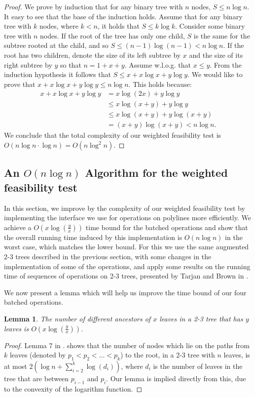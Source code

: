 \documentclass[11pt,a4paper]{article}
\newtheorem{lemma}{Lemma}
\theoremstyle{definition}
\theoremstyle{remark}
\begin{document}
\begin{proof}
We prove by induction that for any binary tree with $n$ nodes, $S \leq n \log n$. It easy to see that the base of the induction holds. Assume that for any binary tree with $k$ nodes, where $k<n$, it holds that $S \leq k\log k$. Consider some binary tree with $n$ nodes. If the root of the tree has only one child, $S$ is the same for the subtree rooted at the child, and so $S \leq (n-1)\log (n-1) < n \log n$. If the root has two children, denote the size of its left subtree by $x$ and the size of its right subtree by $y$ so that $n=1+x+y$. Assume w.l.o.g. that $x \leq y$. From the induction hypothesis it follows that $S \leq x + x \log x + y \log y$. We would like to prove that $x + x \log x + y \log y \leq n \log n$. This holds because:
\begin{align*}
x + x\log x + y\log y &= x \log (2x) + y\log y \\
& \leq x \log (x+y) + y\log y \\
& \leq x \log (x+y) + y \log (x+y) \\
& = (x+y)\log(x+y) < n \log n.
\end{align*}
We conclude that the total complexity of our weighted feasibility test is $O(n \log n \cdot \log n) = O(n \log ^2 n)$.
\end{proof}


\subsection{An \boldmath$O(n \log n)$ Algorithm for the weighted feasibility test}
In this section, we improve by the complexity of our weighted feasibility test by implementing the interface we use for operations on polylines more efficiently. We achieve a $O(x \log (\frac{y}{x}))$ time bound for the batched operations and show that the overall running time induced by this implementation is $O(n \log n)$ in the worst case, which matches the lower bound. For this we use the same augmented 2-3 trees described in the previous section, with some changes in the implementation of some of the operations, and apply some results on the running time of sequences of operations on 2-3 trees, presented by Tarjan and Brown in \cite{Brown1980}.


We now present a lemma which will help us improve the time bound of our four batched operations.

\begin{lemma} \label{number of ancestors lemma}
The number of different ancestors of $x$ leaves in a 2-3 tree that has $y$ leaves is $O(x \log (\frac{y}{x}))$.
\end{lemma}
\begin{proof}
Lemma 7 in \cite{Brown1980}.
shows that the number of nodes which lie on the paths from $k$ leaves (denoted by $p_1<p_2<...<p_k$) to the root, in a 2-3 tree with $n$ leaves, is at most $2( \log n + \sum_{i=2}^{k} \log (d_i))$, where $d_i$ is the number of leaves in the tree that are between $p_{i-1}$ and $p_i$. Our lemma is implied directly from this, due to the convexity of the logarithm function.
\end{proof}
\end{document}
